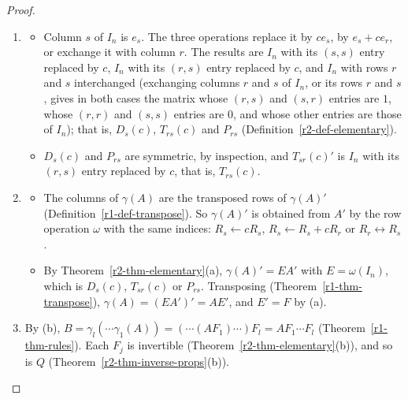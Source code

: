 \documentclass[12pt]{article}
\theoremstyle{definition}
\begin{document}
\begin{proof}
\begin{enumerate}
\item
\begin{itemize}
\item Column \(s\) of \(I_n\) is \(e_s\). The three operations replace it by \(ce_s\), by \(e_s+ce_r\), or exchange it
with column \(r\). The results are \(I_n\) with its \((s,s)\) entry replaced by \(c\), \(I_n\) with its \((r,s)\)
entry replaced by \(c\), and \(I_n\) with rows \(r\) and \(s\) interchanged (exchanging columns \(r\) and \(s\) of
\(I_n\), or its rows \(r\) and \(s\), gives in both cases the matrix whose \((r,s)\) and \((s,r)\) entries are \(1\),
whose \((r,r)\) and \((s,s)\) entries are \(0\), and whose other entries are those of \(I_n\)); that is, \(D_s(c)\),
\(T_{rs}(c)\) and \(P_{rs}\) (Definition~\ref{r2-def-elementary}).
\item \(D_s(c)\) and \(P_{rs}\) are symmetric, by inspection, and \(T_{sr}(c)'\) is \(I_n\) with its \((r,s)\)
entry replaced by \(c\), that is, \(T_{rs}(c)\).
\end{itemize}
\item
\begin{itemize}
\item The columns of \(\gamma(A)\) are the transposed rows of \(\gamma(A)'\) (Definition~\ref{r1-def-transpose}).
So \(\gamma(A)'\) is obtained from \(A'\) by the row operation \(\omega\) with the same indices:
\(R_s\leftarrow cR_s\), \(R_s\leftarrow R_s+cR_r\) or \(R_r\leftrightarrow R_s\).
\item By Theorem~\ref{r2-thm-elementary}(a), \(\gamma(A)'=EA'\) with \(E=\omega(I_n)\), which is \(D_s(c)\),
\(T_{sr}(c)\) or \(P_{rs}\). Transposing (Theorem~\ref{r1-thm-transpose}), \(\gamma(A)=(EA')'=AE'\), and \(E'=F\)
by (a).
\end{itemize}
\item By (b), \(B=\gamma_l(\cdots\gamma_1(A))=(\cdots(AF_1)\cdots)F_l=AF_1\cdots F_l\)
(Theorem~\ref{r1-thm-rules}). Each \(F_j\) is invertible (Theorem~\ref{r2-thm-elementary}(b)), and so is \(Q\)
(Theorem~\ref{r2-thm-inverse-props}(b)).\qedhere
\end{enumerate}
\end{proof}
\end{document}

